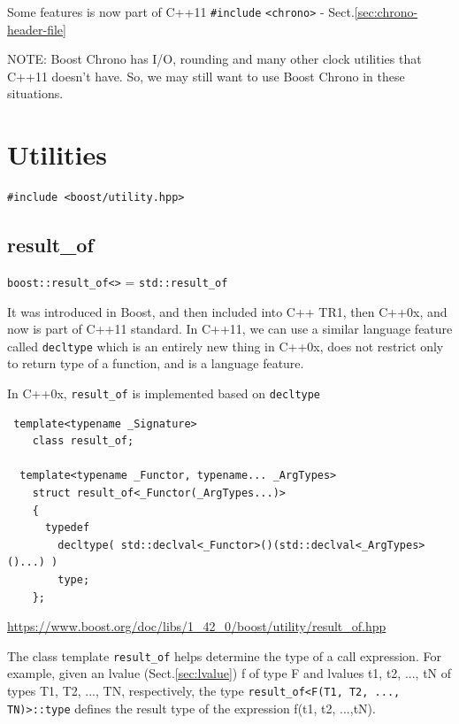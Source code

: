 Some features is now part of C++11 \verb!#include! \verb!<chrono>! - Sect.\ref{sec:chrono-header-file}
   
NOTE: Boost Chrono has I/O, rounding and many other clock utilities that C++11
doesn't have. So, we may still want to use Boost Chrono in these situations.

\section{Utilities}


\begin{verbatim}
#include <boost/utility.hpp>
\end{verbatim}



\subsection{result\_of}
\label{sec:result_of-BOOST}

\verb!boost::result_of<>! =  \verb!std::result_of!

It was introduced in Boost, and then included into C++ TR1, then C++0x, and now
is part of C++11 standard.
In C++11, we can use a similar language feature called \verb!decltype! which is
an entirely new thing in C++0x, does not restrict only to return type of a
function, and is a language feature.

In C++0x, \verb!result_of! is implemented based on \verb!decltype!
\begin{verbatim}
 template<typename _Signature>
    class result_of;

  template<typename _Functor, typename... _ArgTypes>
    struct result_of<_Functor(_ArgTypes...)>
    {
      typedef
        decltype( std::declval<_Functor>()(std::declval<_ArgTypes>()...) )
        type;
    };
\end{verbatim}

\url{https://www.boost.org/doc/libs/1_42_0/boost/utility/result_of.hpp}

The class template \verb!result_of! helps determine the type of a call
expression.
For example, given an lvalue (Sect.\ref{sec:lvalue}) f of type F and lvalues
t1, t2, ..., tN of types T1, T2, ..., TN, respectively, the type
\verb!result_of<F(T1, T2, ..., TN)>::type! defines the result type of the
expression f(t1, t2, ...,tN).

\begin{verbatim}

\end{verbatim}

